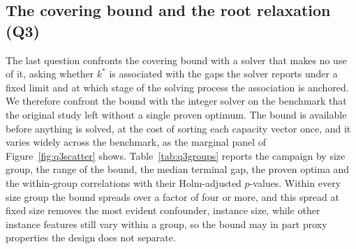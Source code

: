 \subsection{The covering bound and the root relaxation (Q3)}
\label{sec:exp-q3}

The last question confronts the covering bound with a solver that
makes no use of it, asking whether $k^\ast$ is associated with the
gaps the solver reports under a fixed limit and at which stage of the
solving process the association is anchored. We therefore
confront the bound with the integer
solver on the benchmark that the original study left without a single proven
optimum. The bound is available
before anything is solved, at the cost of sorting each capacity vector
once, and it varies widely across the benchmark, as the marginal panel
of Figure~\ref{fig:q3scatter} shows. Table~\ref{tab:q3groups} reports the campaign by
size group, the range of the bound, the median terminal gap, the proven
optima and the within-group correlations with their Holm-adjusted
$p$-values. Within every size group the
bound spreads over a factor of four or more, and this spread at fixed
size removes the most evident confounder, instance size, while other
instance features still vary within a group, so the bound may in part
proxy properties the design does not separate.



